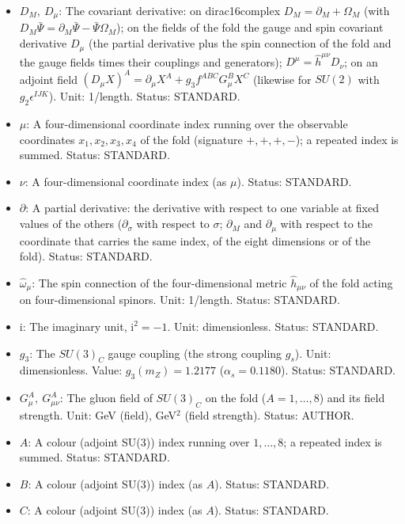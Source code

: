 \documentclass[
  10pt,
]{article}
\providecommand{\tightlist}{%
  \setlength{\itemsep}{0pt}\setlength{\parskip}{0pt}}
\begin{document}
\begin{itemize}
\tightlist
\item
  \(D_M,\ D_\mu\): The covariant derivative: on dirac16complex
  \(D_M = \partial_M + \Omega_M\) (with
  \(D_M\bar\Psi = \partial_M\bar\Psi - \bar\Psi\Omega_M\)); on the
  fields of the fold the gauge and spin covariant derivative \(D_\mu\)
  (the partial derivative plus the spin connection of the fold and the
  gauge fields times their couplings and generators);
  \(D^\mu = \hat h^{\mu\nu}D_\nu\); on an adjoint field
  \((D_\mu X)^A = \partial_\mu X^A + g_3f^{ABC}G^B_\mu X^C\) (likewise
  for \(SU(2)\) with \(g_2\epsilon^{IJK}\)). Unit: 1/length. Status:
  STANDARD.
\item
  \(\mu\): A four-dimensional coordinate index running over the
  observable coordinates \(x_1, x_2, x_3, x_4\) of the fold (signature
  \(+,+,+,-\)); a repeated index is summed. Status: STANDARD.
\item
  \(\nu\): A four-dimensional coordinate index (as \(\mu\)). Status:
  STANDARD.
\item
  \(\partial\): A partial derivative: the derivative with respect to one
  variable at fixed values of the others (\(\partial_\sigma\) with
  respect to \(\sigma\); \(\partial_M\) and \(\partial_\mu\) with
  respect to the coordinate that carries the same index, of the eight
  dimensions or of the fold). Status: STANDARD.
\item
  \(\hat\omega_\mu\): The spin connection of the four-dimensional metric
  \(\hat h_{\mu\nu}\) of the fold acting on four-dimensional spinors.
  Unit: 1/length. Status: STANDARD.
\item
  \(\mathrm{i}\): The imaginary unit, \(\mathrm{i}^2 = -1\). Unit:
  dimensionless. Status: STANDARD.
\item
  \(g_3\): The \(SU(3)_C\) gauge coupling (the strong coupling \(g_s\)).
  Unit: dimensionless. Value: \(g_3(m_Z) = 1.2177\)
  (\(\alpha_s = 0.1180\)). Status: STANDARD.
\item
  \(G^A_\mu,\ G^A_{\mu\nu}\): The gluon field of \(SU(3)_C\) on the fold
  (\(A = 1, \dots, 8\)) and its field strength. Unit: GeV (field),
  GeV\(^2\) (field strength). Status: AUTHOR.
\item
  \(A\): A colour (adjoint SU(3)) index running over \(1, \dots, 8\); a
  repeated index is summed. Status: STANDARD.
\item
  \(B\): A colour (adjoint SU(3)) index (as \(A\)). Status: STANDARD.
\item
  \(C\): A colour (adjoint SU(3)) index (as \(A\)). Status: STANDARD.

\end{itemize}
\end{document}
